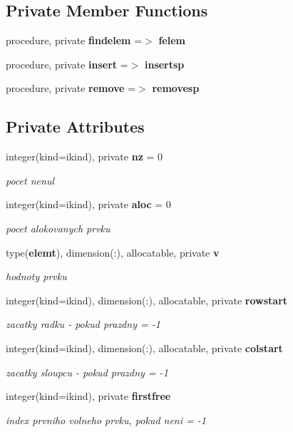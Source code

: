 \subsection*{Private Member Functions}
\begin{DoxyCompactItemize}
\item 
procedure, private {\bf findelem} =$>$ {\bf felem}
\item 
procedure, private {\bf insert} =$>$ {\bf insertsp}
\item 
procedure, private {\bf remove} =$>$ {\bf removesp}
\end{DoxyCompactItemize}
\subsection*{Private Attributes}
\begin{DoxyCompactItemize}
\item 
integer(kind=ikind), private {\bf nz} = 0
\begin{DoxyCompactList}\small\item\em pocet nenul \end{DoxyCompactList}\item 
integer(kind=ikind), private {\bf aloc} = 0
\begin{DoxyCompactList}\small\item\em pocet alokovanych prvku \end{DoxyCompactList}\item 
type({\bf elemt}), dimension(\+:), allocatable, private {\bf v}
\begin{DoxyCompactList}\small\item\em hodnoty prvku \end{DoxyCompactList}\item 
integer(kind=ikind), dimension(\+:), allocatable, private {\bf rowstart}
\begin{DoxyCompactList}\small\item\em zacatky radku -\/ pokud prazdny = -\/1 \end{DoxyCompactList}\item 
integer(kind=ikind), dimension(\+:), allocatable, private {\bf colstart}
\begin{DoxyCompactList}\small\item\em zacatky sloupcu -\/ pokud prazdny = -\/1 \end{DoxyCompactList}\item 
integer(kind=ikind), private {\bf firstfree}
\begin{DoxyCompactList}\small\item\em index prvniho volneho prvku, pokud neni = -\/1 \end{DoxyCompactList}\end{DoxyCompactItemize}


